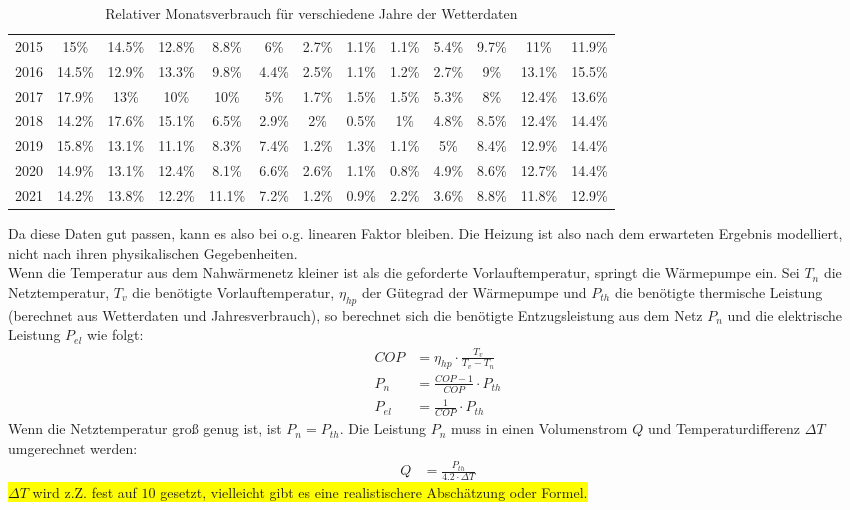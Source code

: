 \documentclass[12pt,a4paper]{article}
\begin{document}
\begin{table}[h]
\begin{tabular}[h]{c|c|c|c|c|c|c|c|c|c|c|c|c}
2015 & 15\% & 14.5\% & 12.8\% & 8.8\% & 6\% & 2.7\% & 1.1\% & 1.1\% & 5.4\% & 9.7\% & 11\% & 11.9\% \\
2016 & 14.5\% & 12.9\% & 13.3\% & 9.8\% & 4.4\% & 2.5\% & 1.1\% & 1.2\% & 2.7\% & 9\% & 13.1\% & 15.5\% \\
2017 & 17.9\% & 13\% & 10\% & 10\% & 5\% & 1.7\% & 1.5\% & 1.5\% & 5.3\% & 8\% & 12.4\% & 13.6\% \\
2018 & 14.2\% & 17.6\% & 15.1\% & 6.5\% & 2.9\% & 2\% & 0.5\% & 1\% & 4.8\% & 8.5\% & 12.4\% & 14.4\% \\
2019 & 15.8\% & 13.1\% & 11.1\% & 8.3\% & 7.4\% & 1.2\% & 1.3\% & 1.1\% & 5\% & 8.4\% & 12.9\% & 14.4\% \\
2020 & 14.9\% & 13.1\% & 12.4\% & 8.1\% & 6.6\% & 2.6\% & 1.1\% & 0.8\% & 4.9\% & 8.6\% & 12.7\% & 14.4\% \\
2021 & 14.2\% & 13.8\% & 12.2\% & 11.1\% & 7.2\% & 1.2\% & 0.9\% & 2.2\% & 3.6\% & 8.8\% & 11.8\% & 12.9\% \\
\end{tabular}
\caption{Relativer Monatsverbrauch für verschiedene Jahre der Wetterdaten}
\label{Monatsverbrauch}
\end{table}
Da diese Daten gut passen, kann es also bei o.g. linearen Faktor bleiben. Die Heizung ist also nach dem erwarteten Ergebnis modelliert, nicht nach ihren physikalischen Gegebenheiten.\\
Wenn die Temperatur aus dem Nahwärmenetz kleiner ist als die geforderte Vorlauftemperatur, springt die Wärmepumpe ein.
Sei $T_{n}$ die Netztemperatur, $T_{v}$ die benötigte Vorlauftemperatur, $\eta_{hp}$ der Gütegrad der Wärmepumpe und $P_{th}$ die benötigte thermische Leistung (berechnet aus Wetterdaten und Jahresverbrauch), so berechnet sich die benötigte Entzugsleistung aus dem Netz $P_{n}$ und die elektrische Leistung $P_{el}$ wie folgt:
\begin{align}
    COP &= \eta_{hp}\cdot \frac{T_{v}}{T_{v}-T_{n}}\\
    P_{n} &= \frac{COP-1}{COP}\cdot P_{th}\\
    P_{el} &= \frac{1}{COP}\cdot P_{th}
\end{align}
Wenn die Netztemperatur groß genug ist, ist $P_{n}=P_{th}$.
Die Leistung $P_{n}$ muss in einen Volumenstrom $Q$ und Temperaturdifferenz $\Delta T$ umgerechnet werden:
\begin{align}
    Q &= \frac{P_{th}}{4.2\cdot\Delta T}
\end{align}
\colorbox{Yellow}{$\Delta T$  wird z.Z. fest auf $10$ gesetzt, vielleicht gibt es eine realistischere Abschätzung oder Formel.}
\end{document}
